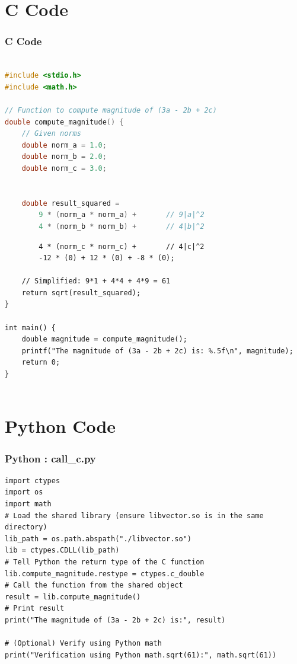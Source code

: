 \documentclass{beamer}
\theoremstyle{remark}
\numberwithin{equation}{section}
\begin{document}
\section{C Code}
\begin{frame}[fragile]
\frametitle{C Code }
\begin{lstlisting}[language=C]

#include <stdio.h>
#include <math.h>

// Function to compute magnitude of (3a - 2b + 2c)
double compute_magnitude() {
    // Given norms
    double norm_a = 1.0;
    double norm_b = 2.0;
    double norm_c = 3.0;


    double result_squared =
        9 * (norm_a * norm_a) +       // 9|a|^2
        4 * (norm_b * norm_b) +       // 4|b|^2
        \end{lstlisting}
        \end{frame}
        \begin{frame}[fragile]
        \begin{lstlisting}
        4 * (norm_c * norm_c) +       // 4|c|^2
        -12 * (0) + 12 * (0) + -8 * (0);

    // Simplified: 9*1 + 4*4 + 4*9 = 61
    return sqrt(result_squared);
}

int main() {
    double magnitude = compute_magnitude();
    printf("The magnitude of (3a - 2b + 2c) is: %.5f\n", magnitude);
    return 0;
}
    
\end{lstlisting}
\end{frame}

\section{Python Code}
\begin{frame}[fragile]
\frametitle{Python : call\_c.py}
\begin{lstlisting}
import ctypes
import os
import math
# Load the shared library (ensure libvector.so is in the same directory)
lib_path = os.path.abspath("./libvector.so")
lib = ctypes.CDLL(lib_path)
# Tell Python the return type of the C function
lib.compute_magnitude.restype = ctypes.c_double
# Call the function from the shared object
result = lib.compute_magnitude()
# Print result
print("The magnitude of (3a - 2b + 2c) is:", result)

# (Optional) Verify using Python math
print("Verification using Python math.sqrt(61):", math.sqrt(61))

\end{lstlisting}
\end{frame}
\end{document}
